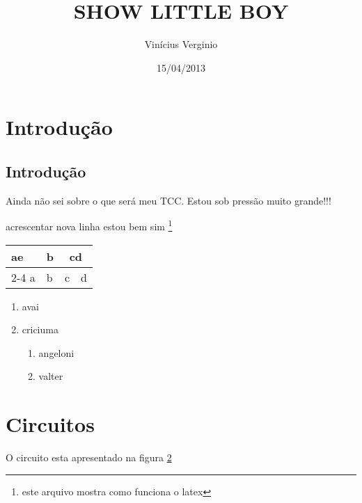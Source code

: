 \documentclass{report}
\author{Vinícius Verginio}
\date{15/04/2013}
\title{SHOW LITTLE BOY}
\begin{document}
\maketitle

\newpage
\chapter{Introdução}
\section{Introdução}
\label{sec:intro} %
Ainda não sei sobre o que será meu TCC. Estou sob pressão muito grande!!! %

acrescentar nova linha
\hfill estou bem sim %
\footnote{este arquivo mostra como funciona o latex} %

\begin{table}
\begin{tabular}{|l|l|l|r|} %
\multirow{2}{*}{ae}
	a & b & \multicolumn{2}{c}{cd} \\
	\cline{2-4}
	a & b & c & d \\ 
	
\end{tabular}
\end{table}




\begin{enumerate}
	\item avai
	\item criciuma
		\begin{enumerate}[label*=\arabic*.]
		\item angeloni
		\item valter		
		\end{enumerate}
\end{enumerate}

\chapter{Circuitos}
\label{fig:circuito}
O circuito esta apresentado na figura \ref{fig:circuito} %
\end{document}
